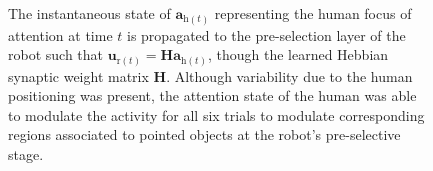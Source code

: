 \documentclass[letterpaper, 10 pt, conference]{ieeeconf}  %
\begin{document}
\begin{figure}[h!]
\begin{center}
	\end{center}
	\caption{The instantaneous state of $\mathbf{a}_{\mathrm{h}(t)}$ representing the human focus of attention at time $t$ is propagated to the pre-selection layer of the robot such that $\mathbf{u}_{\mathrm{r}(t)}=\mathbf{H}\mathbf{a}_{\mathrm{h}(t)}$, though the learned Hebbian synaptic weight matrix $\mathbf{H}$. Although variability due to the human positioning was present, the attention state of the human was able to modulate the activity for all six trials to modulate corresponding regions associated to pointed objects at the robot's pre-selective stage.}
	\label{fig:exp_hebb}
\end{figure}
\end{document}
